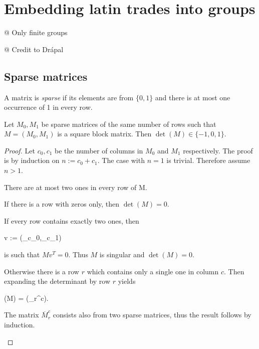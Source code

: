 \chapter{Embedding latin trades into groups}

@ Only finite groups

@ Credit to Drápal

\section{Sparse matrices}

\begin{defn}
A matrix is \emph{sparse} if its elements are from $\{0,1\}$ and there is at most one occurrence of 1 in every row.
\end{defn}

\begin{lem}
\label{lem:sparse2}
Let $M_0,M_1$ be sparse matrices of the same number of rows such that $M = (M_0,M_1)$ is a square block matrix. Then $\det(M) \in \{-1,0,1\}$.
\end{lem}
\begin{proof}
Let $c_0,c_1$ be the number of columns in $M_0$ and $M_1$ respectively. The proof is by induction on $n := c_0+c_1$. The case with $n=1$ is trivial. Therefore assume $n>1$.

There are at most two ones in every row of M.
\begin{cosyitemize}
	\item If there is a row with zeros only, then $\det(M) = 0$.
	\item If every row contains exactly two ones, then
		\begin{cosyeqnarray}
			v := (_{c_0},_{c_1}) \nonumber
		\end{cosyeqnarray}%
		is such that $Mv^T = 0$. Thus $M$ is singular and $\det(M) = 0$.
	\item Otherwise there is a row $r$ which contains only a single one in column $c$. Then expanding the determinant by row $r$ yields
	 \begin{cosyeqnarray}
	 	\det(M) = \pm \det(_r^c).
	 \end{cosyeqnarray}%
	The matrix $\overbar{M}_r^c$ consists also from two sparse matrices, thus the result follows by induction.
\end{cosyitemize}
\end{proof}

